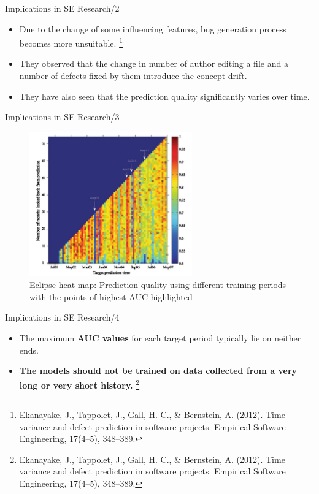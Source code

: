 \documentclass[10pt]{beamer}
\begin{document}
\begin{frame}{Implications in SE Research/2}
\begin{itemize}
    \item Due to the change of some influencing features, bug generation process becomes more unsuitable. \footnote{Ekanayake, J., Tappolet, J., Gall, H. C., \& Bernstein, A. (2012). Time variance and defect prediction in software projects. Empirical Software Engineering, 17(4–5), 348–389.}
    \item They observed that the change in number of author editing a file and a number of defects fixed by them introduce the concept drift.
    \item They have also seen that the prediction quality significantly varies over time. 
\end{itemize}
\end{frame}

\begin{frame}{Implications in SE Research/3}
\begin{figure}[ht]
  \begin{center}
  \includegraphics[width=7cm]{TargetPredictionTime.PNG}
  \end{center}
  \caption{Eclipse heat-map: Prediction quality using different training periods with the points of highest AUC highlighted} 
  \label{tahapan_3}
\end{figure}
\end{frame}

\begin{frame}{Implications in SE Research/4}
\begin{itemize}
    \item The maximum \textbf{AUC values} for each target period typically lie on neither ends.
    \item \textbf{The models should not be trained on data collected from a very long or very short history.} \footnote{Ekanayake, J., Tappolet, J., Gall, H. C., \& Bernstein, A. (2012). Time variance and defect prediction in software projects. Empirical Software Engineering, 17(4–5), 348–389.}
\end{itemize}
\end{frame}
\end{document}

